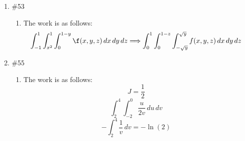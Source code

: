 \documentclass[12pt]{article}
\begin{document}
\begin{enumerate}
	\item \#53 \begin{enumerate}
	
		\item The work is as follows:
        $$\int_{-1}^1\int_{x^2}^1\int_0^{1-y}\f(x,y,z)\,dx\,dy\,dz\Longrightarrow\int_0^{1}\int_{0}^{1-z}\int_{-\sqrt{y}}^{\sqrt{y}}f(x,y,z)\,dx\,dy\,dz$$
	
	\end{enumerate}
	
	\item \#55 \begin{enumerate}
	
		\item The work is as follows:
          $$J=\frac{1}{2}$$
          $$\int_2^4\int_{-2}^0\frac{u}{2v}\,du\,dv$$
          $$-\int_{2}^4 \frac{1}{v}\,dv=-\ln(2) $$

	\end{enumerate}
	
\end{enumerate}
\end{document}
